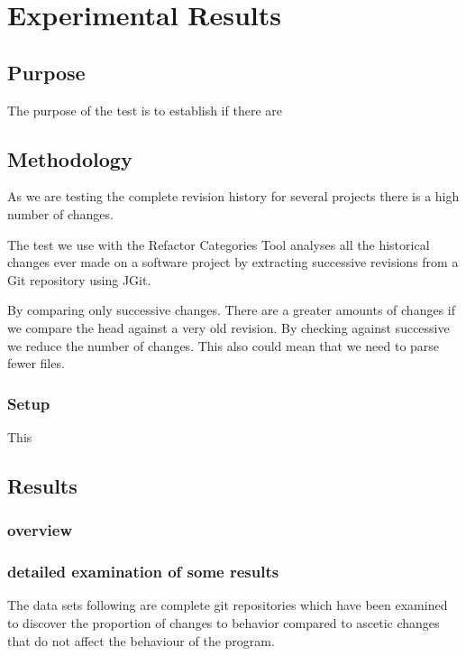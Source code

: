 
\chapter{Experimental Results}

\section{Purpose}
The purpose of the test is to establish if there are 

\section{Methodology}
As we are testing the complete revision history for several projects there is a high number of changes. 

The test we use with the Refactor Categories Tool analyses all the historical changes ever made on a software project by extracting successive revisions from a Git repository using JGit.

By comparing only successive changes.
  There are a greater amounts of changes if we compare the head against a very old revision. By checking against successive we reduce the number of changes. This also could mean that we need to parse fewer files.

\subsection{Setup}
This 
% 
% 
% 
% 
% 
% 

\section{Results}
\subsection{overview}
\subsection{detailed examination of some results}

The data sets following are complete git repositories which have been examined to discover the proportion of changes to behavior compared to ascetic changes that do not affect the behaviour of the program. 

